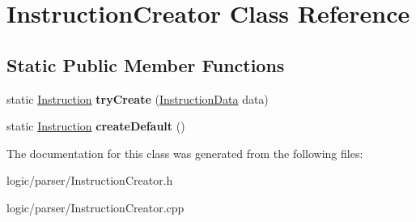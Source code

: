 \hypertarget{classInstructionCreator}{}\section{Instruction\+Creator Class Reference}
\label{classInstructionCreator}
\subsection*{Static Public Member Functions}
\begin{DoxyCompactItemize}
\item 
\mbox{\label{classInstructionCreator_aff6cd584032ef7dc4b7f4b1d2dedda39}} 
static \hyperlink{classInstruction}{Instruction} {\bfseries try\+Create} (\hyperlink{classInstructionData}{Instruction\+Data} data)
\item 
\mbox{\label{classInstructionCreator_a6075f2a2e077f186f115ee911bf53169}} 
static \hyperlink{classInstruction}{Instruction} {\bfseries create\+Default} ()
\end{DoxyCompactItemize}


The documentation for this class was generated from the following files\+:\begin{DoxyCompactItemize}
\item 
logic/parser/Instruction\+Creator.\+h\item 
logic/parser/Instruction\+Creator.\+cpp\end{DoxyCompactItemize}
